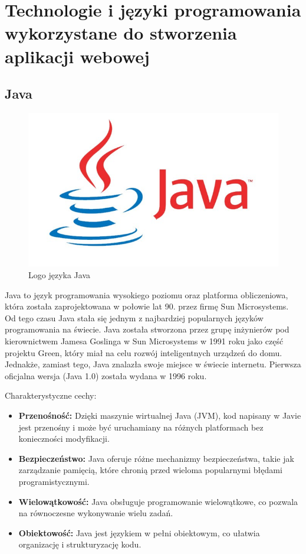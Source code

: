 \chapter{Technologie i języki programowania wykorzystane do stworzenia aplikacji webowej}

\section{Java}
\begin{figure}[h]
    \centering
    \includegraphics[width=0.7\linewidth]{./img/javalogo.jpg}
    \caption{Logo języka Java}
    \label{fig:Java}
\end{figure}
Java to język programowania wysokiego poziomu oraz platforma obliczeniowa, która została zaprojektowana w połowie lat 90. przez firmę Sun Microsystems. Od tego czasu Java stała się jednym z najbardziej popularnych języków programowania na świecie. Java została stworzona przez grupę inżynierów pod kierownictwem Jamesa Goslinga w Sun Microsystems w 1991 roku jako część projektu Green, który miał na celu rozwój inteligentnych urządzeń do domu. Jednakże, zamiast tego, Java znalazła swoje miejsce w świecie internetu. Pierwsza oficjalna wersja (Java 1.0) została wydana w 1996 roku.

Charakterystyczne cechy:
\begin{itemize}
\item \textbf{Przenośność:} Dzięki maszynie wirtualnej Java (JVM), kod napisany w Javie jest przenośny i może być uruchamiany na różnych platformach bez konieczności modyfikacji.
\item \textbf{Bezpieczeństwo:} Java oferuje różne mechanizmy bezpieczeństwa, takie jak zarządzanie pamięcią, które chronią przed wieloma popularnymi błędami programistycznymi.
\item \textbf{Wielowątkowość:} Java obsługuje programowanie wielowątkowe, co pozwala na równoczesne wykonywanie wielu zadań.
\item \textbf{Obiektowość:} Java jest językiem w pełni obiektowym, co ułatwia organizację i strukturyzację kodu.
\end{itemize}


